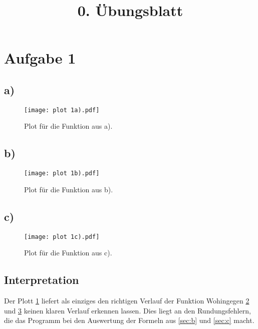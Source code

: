 


\title{0. Übungsblatt}



\maketitle
\thispagestyle{empty}
\newpage



\section{Aufgabe 1}
\subsection{a)}
\label{sec:1a}


\begin{figure}
  \centering
  \texttt{[image: plot 1a).pdf]}
  \caption{Plot für die Funktion aus a).}
  \label{fig:a}
\end{figure}

\subsection{b)}
\label{sec:1b}

\begin{figure}
  \centering
  \texttt{[image: plot 1b).pdf]}
  \caption{Plot für die Funktion aus b).}
  \label{fig:b}
\end{figure}
\FloatBarrier

\subsection{c)}
\label{sec:1c}

\begin{figure}
  \centering
  \texttt{[image: plot 1c).pdf]}
  \caption{Plot für die Funktion aus c).}
  \label{fig:c}
\end{figure}

\subsection{Interpretation}
Der Plott \ref{fig:a} liefert als einziges den richtigen Verlauf der Funktion
Wohingegen \ref{fig:b} und \ref{fig:c}  keinen klaren Verlauf erkennen lassen.
Dies liegt an den Rundungsfehlern, die das Programm
bei den Auswertung der Formeln aus \ref{sec:b} und \ref{sec:c} macht.

